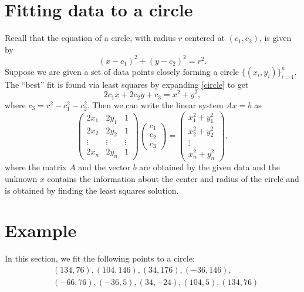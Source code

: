 \label{LeastSquaresCircle}


\section*{Fitting data to a circle}

Recall that the equation of a circle, with radius $r$ centered at $(c_1,c_2)$, is given by
\begin{equation}
\label{circle}
(x-c_1)^2 + (y-c_2)^2 = r^2.
\end{equation}
Suppose we are given a set of data points closely forming a circle $\{(x_i,y_i)\}^n_{i=1}$.  The ``best'' fit is found via least squares by expanding \eqref{circle} to get
\[
2 c_1 x + 2 c_2 y + c_3 = x^2 + y^2,
\]
where $c_3 = r^2 - c_1^2 - c_2^2$.  Then we can write the linear system $A x = b$ as
\[
\begin{pmatrix}
2 x_1 & 2 y_1 & 1\\
2 x_2 & 2 y_2 & 1\\
\vdots & \vdots & \vdots \\
2 x_n & 2 y_n & 1
\end{pmatrix}
\begin{pmatrix}
c_1\\
c_2\\
c_3
\end{pmatrix}=
\begin{pmatrix}
x_1^2 + y_1^2\\
x_2^2 + y_2^2\\
\vdots\\
x_n^2 + y_n^2
\end{pmatrix},
\]
where the matrix $A$ and the vector $b$ are obtained by the given data and the unknown $x$ contains the information about the center and radius of the circle and is obtained by finding the least squares solution.

\section*{Example}

In this section, we fit the following points to a circle:
\begin{align*}
&(134,76),(104,146),(34,176),(-36,146),\\
&(-66,76),(-36,5),(34,-24),(104,5),(134,76)
\end{align*}

